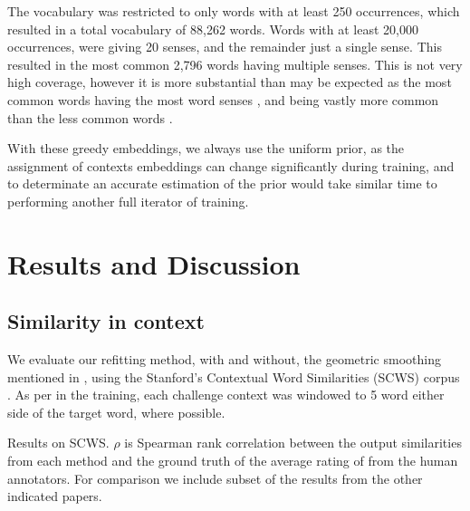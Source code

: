 \documentclass{sig-alternate}
\begin{document}
The vocabulary was restricted to only words with at least 250 occurrences, which resulted in a total vocabulary of 88,262 words. Words with at least 20,000 occurrences, were giving 20 senses, and the remainder just a single sense. This resulted in the most common 2,796 words having multiple senses. This is not very high coverage, however it is more substantial than may be expected as the most common words having the most word senses \parencite{zipf1945meaning}, and being vastly more common than the less common words \parencite{zipf1949human,gilmour2005understanding}.

With these greedy embeddings, we always use the uniform prior, as the assignment of contexts embeddings can change significantly during training, and to determinate an accurate estimation of the prior would take similar time to performing another full iterator of training.


\section{Results and Discussion} \label{results}


\subsection{Similarity in context}

We evaluate our refitting method, with and without, the geometric smoothing mentioned in , using the Stanford's Contextual Word Similarities (SCWS) corpus \parencite{Huang2012}.
As per in the training, each challenge context was windowed to 5 word either side of the target word, where possible.

\begin{table*}

\caption{Results on SCWS. $\rho$ is Spearman rank correlation between the output similarities from each method and the ground truth of the average rating of from the human annotators. For comparison we include subset of the results from the other indicated papers. } \label{swscres}
\end{table*}
\end{document}
